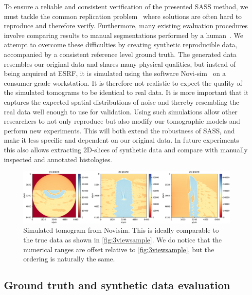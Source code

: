 To ensure a reliable and consistent verification of the presented SASS method,
we must tackle the common replication problem~\cite{replication-crisis} where
solutions are often hard to reproduce and therefore verify. Furthermore, many
existing evaluation procedures involve comparing results to manual
segmentations performed by a human~\cite{seg_literature_review}. We attempt to
overcome these difficulties by creating synthetic reproducible data,
accompanied by a consistent reference level ground truth. The generated data
resembles our original data and shares many physical qualities, but instead of
being acquired at ESRF, it is simulated using the software
Novi-sim~\cite{novisim} on a consumer-grade workstation. It is therefore not
realistic to expect the quality of the simulated tomograms to be identical to
real data. It is more important that it captures the expected spatial
distributions of noise and thereby resembling the real data well enough to use
for validation.  Using such simulations allow other researchers to not only
reproduce but also modify our tomographic models and perform new experiments.
This will both extend the robustness of SASS, and make it less specific and
dependent on our original data.  In future experiments this also allows
extracting 2D-slices of synthetic data and compare with manually inspected and
annotated histologies.

\begin{figure}
  \centering
  \includegraphics[width=\textwidth]{figures/novisim_raw_2x.pdf}
  \caption{Simulated tomogram from Novisim. This is ideally comparable to the
	true data as shown in \cref{fig:3viewsample}. We do notice that the
	numerical ranges are offset relative to \cref{fig:3viewsample}, but the
	ordering is naturally the same.}
  \label{fig:novisimraw}
\end{figure}

\subsection{Ground truth and synthetic data evaluation}

